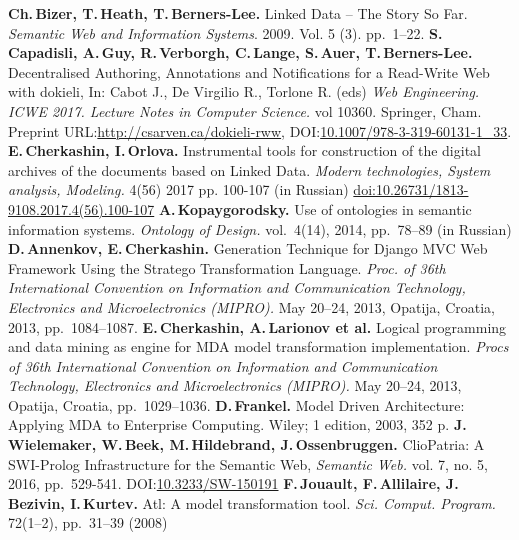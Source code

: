 \documentclass[runningheads]{llncs}
\begin{document}
\begin{thebibliography}{11}
 \textbf{Ch.\,Bizer, T.\,Heath, T.\,Berners-Lee.} Linked Data -- The Story So Far. \emph{Semantic Web and Information Systems}. 2009. Vol. 5 (3). pp.~1--22.
 \textbf{S.\,Capadisli, A.\,Guy, R.\,Verborgh, C.\,Lange, S.\,Auer, T.\,Berners-Lee.} Decentralised Authoring, Annotations and Notifications for a Read-Write Web with dokieli, In: Cabot J., De Virgilio R., Torlone R. (eds) \emph{Web Engineering. ICWE 2017. Lecture Notes in Computer Science.} vol 10360. Springer, Cham. Preprint URL:\url{http://csarven.ca/dokieli-rww}, DOI:\url{10.1007/978-3-319-60131-1_33}.
 \textbf{E.\,Cherkashin, I.\,Orlova.} Instrumental tools for construction of the digital archives of the documents based on Linked Data. \emph{Modern technologies, System analysis, Modeling.} 4(56) 2017 pp. 100-107 (in Russian) \href{http://stsam.irgups.ru/sites/default/files/articles\_pdf\_files/100-107.pdf}{doi:10.26731/1813-9108.2017.4(56).100-107}
 \textbf{A.\,Kopaygorodsky.} Use of ontologies in semantic information systems. \emph{Ontology of Design.} vol.~4(14), 2014, pp.~78--89 (in Russian) %
 \textbf{D.\,Annenkov, E.\,Cherkashin.} Generation Technique for Django MVC Web Framework Using the Stratego Transformation Language. \emph{Proc. of 36th International Convention on Information and Communication Technology, Electronics and Microelectronics (MIPRO).} May 20--24, 2013, Opatija, Croatia, 2013, pp.~1084--1087.
 \textbf{E.\,Cherkashin, A.\,Larionov et al.} Logical programming and data mining as engine for MDA model transformation implementation. \emph{Procs of 36th International Convention on Information and Communication Technology, Electronics and Microelectronics (MIPRO).} May 20--24, 2013, Opatija, Croatia, pp.~1029--1036.
 \textbf{D.\,Frankel.} Model Driven Architecture: Applying MDA to Enterprise Computing. Wiley; 1 edition, 2003, 352 p.
 \textbf{J.\,Wielemaker, W.\,Beek, M.\,Hildebrand, J.\,Ossenbruggen.} ClioPatria: A SWI-Prolog Infrastructure for the Semantic Web, \emph{Semantic Web.} vol. 7, no. 5, 2016, pp.~529-541. DOI:\url{10.3233/SW-150191}
 \textbf{F.\,Jouault, F.\,Allilaire, J.\,Bezivin, I.\,Kurtev.} Atl: A model transformation tool. \emph{Sci. Comput. Program.} 72(1--2), pp.~31--39 (2008)

\end{thebibliography}
\end{document}
